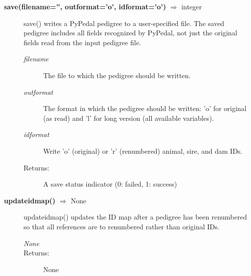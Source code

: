\begin{description}
\item[\textbf{save(filename='', outformat='o', idformat='o')} $\Rightarrow$ integer]
save() writes a PyPedal pedigree to a user-specified file. The saved pedigree includes all fields recognized by PyPedal, not just the original fields read from the input pedigree file.
\begin{description}
\item[\emph{filename}] The file to which the pedigree should be written.
\item[\emph{outformat}] The format in which the pedigree should be written: 'o' for original (as read) and 'l' for long version (all available variables).
\item[\emph{idformat}] Write 'o' (original) or 'r' (renumbered) animal, sire, and dam IDs.
\item[Returns:] A save status indicator (0: failed, 1: success)
\end{description}

\item[\textbf{updateidmap()} $\Rightarrow$ None]
updateidmap() updates the ID map after a pedigree has been renumbered so that all references are to renumbered rather than original IDs.
\begin{description}
\item[\emph{None}]
\item[Returns:] None
\end{description}

\end{description}

